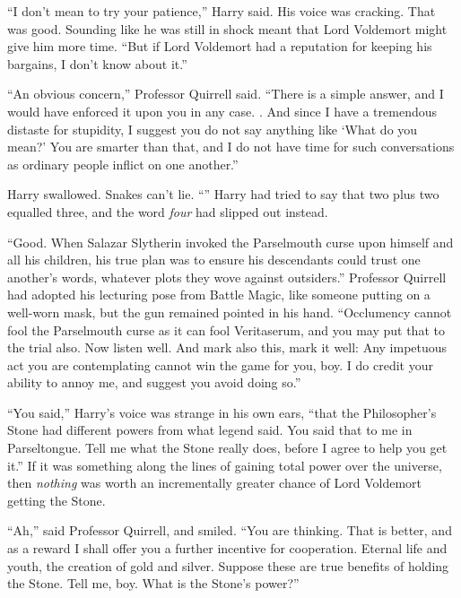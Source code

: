 “I don’t mean to try your patience,” Harry said. His voice was cracking. That was good. Sounding like he was still in shock meant that Lord Voldemort might give him more time. “But if Lord Voldemort had a reputation for keeping his bargains, I don’t know about it.”

“An obvious concern,” Professor Quirrell said. “There is a simple answer, and I would have enforced it upon you in any case. . And since I have a tremendous distaste for stupidity, I suggest you do not say anything like ‘What do you mean?’ You are smarter than that, and I do not have time for such conversations as ordinary people inflict on one another.”

Harry swallowed. Snakes can’t lie. “” Harry had tried to say that two plus two equalled three, and the word \emph{four} had slipped out instead.

“Good. When Salazar Slytherin invoked the Parselmouth curse upon himself and all his children, his true plan was to ensure his descendants could trust one another’s words, whatever plots they wove against outsiders.” Professor Quirrell had adopted his lecturing pose from Battle Magic, like someone putting on a well-worn mask, but the gun remained pointed in his hand. “Occlumency cannot fool the Parselmouth curse as it can fool Veritaserum, and you may put that to the trial also. Now listen well.  And mark also this, mark it well:  Any impetuous act you are contemplating cannot win the game for you, boy. I do credit your ability to annoy me, and suggest you avoid doing so.”

“You said,” Harry’s voice was strange in his own ears, “that the Philosopher’s Stone had different powers from what legend said. You said that to me in Parseltongue. Tell me what the Stone really does, before I agree to help you get it.” If it was something along the lines of gaining total power over the universe, then \emph{nothing} was worth an incrementally greater chance of Lord Voldemort getting the Stone.

“Ah,” said Professor Quirrell, and smiled. “You are thinking. That is better, and as a reward I shall offer you a further incentive for cooperation. Eternal life and youth, the creation of gold and silver. Suppose these are true benefits of holding the Stone. Tell me, boy. What is the Stone’s power?”

